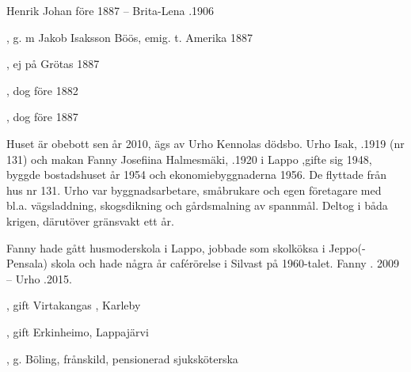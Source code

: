 Henrik Johan \textdied före 1887  --  Brita-Lena .1906
\begin{jhchildren}
  \item {}
  \item {}, g. m Jakob Isaksson Böös, emig. t. Amerika 1887
  \item {}
  \item {}
  \item {}
  \item {}, ej på Grötas 1887
  \item {}, dog före 1882
  \item {}, dog före 1887
\end{jhchildren}




Huset är obebott sen år 2010, ägs av Urho Kennolas dödsbo. Urho Isak, .1919 (nr 131) och makan Fanny Josefiina Halmesmäki, .1920 i Lappo ,gifte sig 1948, byggde bostadshuset år 1954 och ekonomiebyggnaderna 1956. De flyttade från hus nr 131. Urho var byggnadsarbetare, småbrukare och egen företagare med bl.a. vägsladdning, skogsdikning och gårdsmalning av spannmål. Deltog i båda krigen, därutöver gränsvakt ett år.


Fanny hade gått husmoderskola i Lappo, jobbade som skolköksa i Jeppo(-Pensala) skola och hade några år caférörelse i Silvast på 1960-talet. Fanny . 2009  --  Urho .2015.
\begin{jhchildren}
  \item {}, gift Virtakangas , Karleby
  \item {}, gift Erkinheimo, Lappajärvi
  \item {}, g. Böling, frånskild, pensionerad sjuksköterska
\end{jhchildren}




